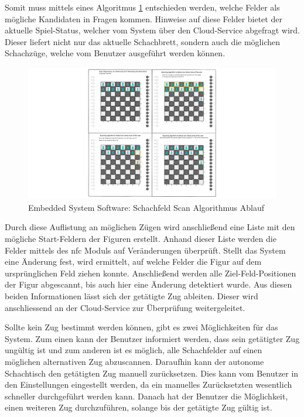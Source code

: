 Somit muss mittels eines Algoritmus \ref{ATC_ChessMoveAlgorithm}
entschieden werden, welche Felder als mögliche Kandidaten in Fragen
kommen. Hinweise auf diese Felder bietet der aktuelle Spiel-Status,
welcher vom System über den Cloud-Service abgefragt wird. Dieser liefert
nicht nur das aktuelle Schachbrett, sondern auch die möglichen
Schachzüge, welche vom Benutzer ausgeführt werden können.

\begin{figure}
\centering
\includegraphics{images/ATC_ChessMoveAlgorithm.png}
\caption{Embedded System Software: Schachfeld Scan Algorithmus Ablauf
\label{ATC_ChessMoveAlgorithm}}
\end{figure}

Durch diese Auflistung an möglichen Zügen wird anschließend eine Liste
mit den mögliche Start-Feldern der Figuren erstellt. Anhand dieser Liste
werden die Felder mittels des \gls{nfc} Moduls auf Veränderungen
überprüft. Stellt das System eine Änderung fest, wird ermittelt, auf
welche Felder die Figur auf dem ursprünglichen Feld ziehen konnte.
Anschließend werden alle Ziel-Feld-Positionen der Figur abgescannt, bis
auch hier eine Änderung detektiert wurde. Aus diesen beiden
Informationen lässt sich der getätigte Zug ableiten. Dieser wird
anschliessend an der Cloud-Service zur Überprüfung weitergeleitet.

Sollte kein Zug bestimmt werden können, gibt es zwei Möglichkeiten für
das System. Zum einen kann der Benutzer informiert werden, dass sein
getätigter Zug ungültig ist und zum anderen ist es möglich, alle
Schachfelder auf einen möglichen alternativen Zug abzuscannen. Daraufhin
kann der autonome Schachtisch den getätigten Zug manuell zurücksetzen.
Dies kann vom Benutzer in den Einstellungen eingestellt werden, da ein
manuelles Zurücksetzten wesentlich schneller durchgeführt werden kann.
Danach hat der Benutzer die Möglichkeit, einen weiteren Zug
durchzuführen, solange bis der getätigte Zug gültig ist.

